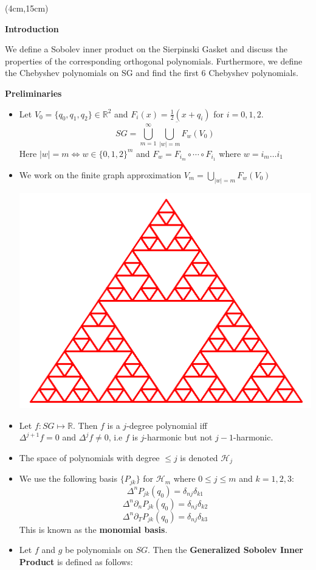 \documentclass[a0, landscape]{a0poster}
\begin{document}
{%
\begin{textblock*}{12in}(4cm,15cm)%
    \begin{minipage}{12in} 
    \begin{center}
            {\LARGE \textcolor{CornellRed}{\textbf{Introduction}}}
        \end{center}
        \vspace{1cm}
        We define a Sobolev inner product on the Sierpinski Gasket and discuss the properties of the corresponding orthogonal polynomials. Furthermore, we define the Chebyshev polynomials on SG and find the first 6 Chebyshev polynomials.
        \vspace{1cm}
        \begin{center}
            {\LARGE \textcolor{CornellRed}{\textbf{Preliminaries}}}
        \end{center}
        \vspace{1cm}
        \begin{itemize}
            \item Let $V_0 = \{q_0, q_1, q_2\} \in \mathbb{R}^2$ and $F_i(x) = \frac{1}{2}(x+q_i)$ for $i=0,1,2$.
            $$SG = \overline{\bigcup_{m=1}^{\infty}\bigcup_{|w|=m}F_w(V_0)}$$
            Here $|w| = m \iff w \in \{0,1,2\}^{m}$ and $F_w = F_{i_m}\circ \cdots \circ F_{i_1}$ where $w = i_m\ldots i_1$
            \item We work on the finite graph approximation $V_m = \bigcup_{|w|=m}F_{w}(V_0)$
            \begin{center}
            \includegraphics[width=0.45\linewidth]{Final_presentation/images/V4.png}
            \label{fig:V4}    
            \end{center}
            \item Let $f: SG \mapsto \mathbb{R}$. Then $f$ is a $j$-degree polynomial iff\\
            $\Delta^{j+1}f = 0$ and $\Delta^{j}f\neq 0$, i.e $f$ is $j$-harmonic but not $j-1$-harmonic. 
            \item The space of polynomials with degree $\le j$ is denoted $\mathcal{H}_{j}$
            \item We use the following basis $\{P_{jk}\}$ for $\mathcal{H}_m$ where $0 \leq j \leq m$ and $k=1,2,3$:
            $$\Delta^nP_{jk}(q_0) = \delta_{nj}\delta_{k1}$$
            $$\Delta^n\partial_nP_{jk}(q_0) = \delta_{nj}\delta_{k2}$$
            $$\Delta^n\partial_TP_{jk}(q_0) = \delta_{nj}\delta_{k3}$$
            This is known as the \textbf{monomial basis}.
            \item Let $f$ and $g$ be polynomials on $SG$. Then the \textbf{Generalized Sobolev Inner Product} is defined as follows: 
            

\end{itemize}
\end{minipage}
\end{textblock*}}
\end{document}
